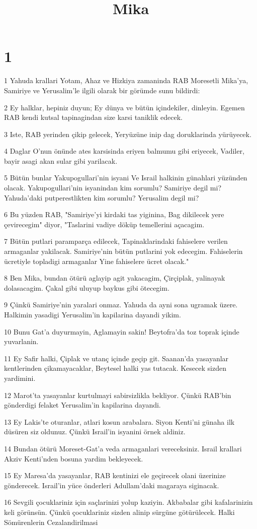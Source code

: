 

\title{Mika}


\chapter{1}

\par 1 Yahuda krallari Yotam, Ahaz ve Hizkiya zamaninda RAB Moresetli Mika'ya, Samiriye ve Yerusalim'le ilgili olarak bir görümde sunu bildirdi:
\par 2 Ey halklar, hepiniz duyun; Ey dünya ve bütün içindekiler, dinleyin. Egemen RAB kendi kutsal tapinagindan size karsi taniklik edecek.
\par 3 Iste, RAB yerinden çikip gelecek, Yeryüzüne inip dag doruklarinda yürüyecek.
\par 4 Daglar O'nun önünde ates karsisinda eriyen balmumu gibi eriyecek, Vadiler, bayir asagi akan sular gibi yarilacak.
\par 5 Bütün bunlar Yakupogullari'nin isyani Ve Israil halkinin günahlari yüzünden olacak. Yakupogullari'nin isyanindan kim sorumlu? Samiriye degil mi? Yahuda'daki putperestlikten kim sorumlu? Yerusalim degil mi?
\par 6 Bu yüzden RAB, "Samiriye'yi kirdaki tas yiginina, Bag dikilecek yere çevirecegim" diyor, "Taslarini vadiye döküp temellerini açacagim.
\par 7 Bütün putlari paramparça edilecek, Tapinaklarindaki fahiselere verilen armaganlar yakilacak. Samiriye'nin bütün putlarini yok edecegim. Fahiselerin ücretiyle topladigi armaganlar Yine fahiselere ücret olacak."
\par 8 Ben Mika, bundan ötürü aglayip agit yakacagim, Çirçiplak, yalinayak dolasacagim. Çakal gibi uluyup baykus gibi ötecegim.
\par 9 Çünkü Samiriye'nin yaralari onmaz. Yahuda da ayni sona ugramak üzere. Halkimin yasadigi Yerusalim'in kapilarina dayandi yikim.
\par 10 Bunu Gat'a duyurmayin, Aglamayin sakin! Beytofra'da toz toprak içinde yuvarlanin.
\par 11 Ey Safir halki, Çiplak ve utanç içinde geçip git. Saanan'da yasayanlar kentlerinden çikamayacaklar, Beytesel halki yas tutacak. Kesecek sizden yardimini.
\par 12 Marot'ta yasayanlar kurtulmayi sabirsizlikla bekliyor. Çünkü RAB'bin gönderdigi felaket Yerusalim'in kapilarina dayandi.
\par 13 Ey Lakis'te oturanlar, atlari kosun arabalara. Siyon Kenti'ni günaha ilk düsüren siz oldunuz. Çünkü Israil'in isyanini örnek aldiniz.
\par 14 Bundan ötürü Moreset-Gat'a veda armaganlari vereceksiniz. Israil krallari Akziv Kenti'nden bosuna yardim bekleyecek.
\par 15 Ey Maresa'da yasayanlar, RAB kentinizi ele geçirecek olani üzerinize gönderecek. Israil'in yüce önderleri Adullam'daki magaraya siginacak.
\par 16 Sevgili çocuklariniz için saçlarinizi yolup kaziyin. Akbabalar gibi kafalarinizin keli görünsün. Çünkü çocuklariniz sizden alinip sürgüne götürülecek. Halki Sömürenlerin Cezalandirilmasi

